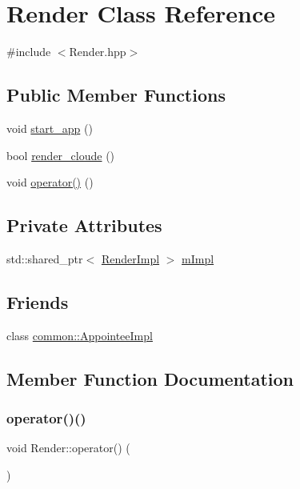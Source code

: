 \hypertarget{classRender}{}\section{Render Class Reference}
\label{classRender}


{\ttfamily \#include $<$Render.\+hpp$>$}

\subsection*{Public Member Functions}
\begin{DoxyCompactItemize}
\item 
void \mbox{\hyperlink{classRender_ada6018a6889d8aaf0670872935352427}{start\+\_\+app}} ()
\item 
bool \mbox{\hyperlink{classRender_a59c3987f6c09d1290a316f8c330733b1}{render\+\_\+cloude}} ()
\item 
void \mbox{\hyperlink{classRender_ae55db1f0ffc81bf5fca9f579ceb4577f}{operator()}} ()
\end{DoxyCompactItemize}
\subsection*{Private Attributes}
\begin{DoxyCompactItemize}
\item 
std\+::shared\+\_\+ptr$<$ \mbox{\hyperlink{classRenderImpl}{Render\+Impl}} $>$ \mbox{\hyperlink{classRender_a99d1e6327ef8a6f4835b9f325c82ea02}{m\+Impl}}
\end{DoxyCompactItemize}
\subsection*{Friends}
\begin{DoxyCompactItemize}
\item 
class \mbox{\hyperlink{classRender_a08bca24b08df51759eafe2bf56bd4f3f}{common\+::\+Appointee\+Impl}}
\end{DoxyCompactItemize}


\subsection{Member Function Documentation}
\mbox{\label{classRender_ae55db1f0ffc81bf5fca9f579ceb4577f}} 
\subsubsection{\texorpdfstring{operator()()}{operator()()}}
{\footnotesize\ttfamily void Render\+::operator() (\begin{DoxyParamCaption}{ }\end{DoxyParamCaption})}

